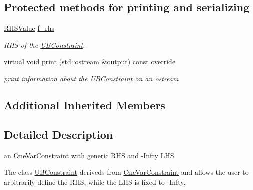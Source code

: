 \subsection*{Protected methods for printing and serializing}
\begin{DoxyCompactItemize}
\item 
\mbox{\label{class_s_m_spp__di__unipi__it_1_1_u_b_constraint_ac41d0fab1f795d45c50f5f342d9d5240}} 
\mbox{\hyperlink{class_s_m_spp__di__unipi__it_1_1_row_constraint_a8813536ab3b13a81c8e83a999ade3bd8}{R\+H\+S\+Value}} \mbox{\hyperlink{class_s_m_spp__di__unipi__it_1_1_u_b_constraint_ac41d0fab1f795d45c50f5f342d9d5240}{f\+\_\+rhs}}
\begin{DoxyCompactList}\small\item\em R\+HS of the \mbox{\hyperlink{class_s_m_spp__di__unipi__it_1_1_u_b_constraint}{U\+B\+Constraint}}. \end{DoxyCompactList}\item 
\mbox{\label{class_s_m_spp__di__unipi__it_1_1_u_b_constraint_a59a9fcbf8f9f86d348344b2073644b0e}} 
virtual void \mbox{\hyperlink{class_s_m_spp__di__unipi__it_1_1_u_b_constraint_a59a9fcbf8f9f86d348344b2073644b0e}{print}} (std\+::ostream \&output) const override
\begin{DoxyCompactList}\small\item\em print information about the \mbox{\hyperlink{class_s_m_spp__di__unipi__it_1_1_u_b_constraint}{U\+B\+Constraint}} on an ostream \end{DoxyCompactList}\end{DoxyCompactItemize}
\subsection*{Additional Inherited Members}


\subsection{Detailed Description}
an \mbox{\hyperlink{class_s_m_spp__di__unipi__it_1_1_one_var_constraint}{One\+Var\+Constraint}} with generic R\+HS and -\/\+Infty L\+HS 

The class \mbox{\hyperlink{class_s_m_spp__di__unipi__it_1_1_u_b_constraint}{U\+B\+Constraint}} deriveds from \mbox{\hyperlink{class_s_m_spp__di__unipi__it_1_1_one_var_constraint}{One\+Var\+Constraint}} and allows the user to arbitrarily define the R\+HS, while the L\+HS is fixed to -\/\+Infty. 


